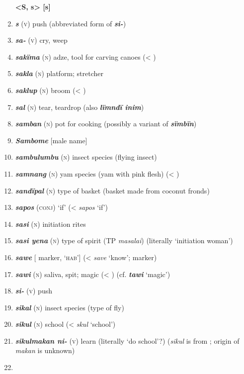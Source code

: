 \begin{enumerate}[noitemsep, label={}, align=left, widest=190, labelsep=1ex,leftmargin=*,itemindent=-10pt]
\noindent \textbf{<S, s>        [s]}\\ \item 

\textbf{\textit{s}} (\textsc{v}) push (abbreviated form of \textbf{\textit{si-}}) \item 
\textbf{\textit{sa-}} (\textsc{v}) cry, weep \item 
\textbf{\textit{sakïma}} (\textsc{n}) adze, tool for carving canoes (< ) \item 
\textbf{\textit{sakla}} (\textsc{n}) platform; stretcher \item 
\textbf{\textit{saklup}} (\textsc{n}) broom (< ) \item 
\textbf{\textit{sal}} (\textsc{n}) tear, teardrop (also \textbf{\textit{lïmndï inim}}) \item 
\textbf{\textit{samban}} (\textsc{n}) pot for cooking (possibly a variant of \textbf{\textit{sïmbïn}}) \item 
\textbf{\textit{Sambome}} [male name] \item 
\textbf{\textit{sambulumbu}} (\textsc{n}) insect species (flying insect) \item 
\textbf{\textit{samnang}} (\textsc{n}) yam species (yam with pink flesh) (< ) \item 
\textbf{\textit{sandïpal}} (\textsc{n}) type of basket (basket made from coconut fronds) \item 
\textbf{\textit{sapos}} (\textsc{conj}) ‘if’ (<  \textit{sapos} ‘if’) \item 
\textbf{\textit{sasi}} (\textsc{n}) initiation rites \item 
\textbf{\textit{sasi yena}} (\textsc{n}) type of spirit (TP \textit{masalai}) (literally ‘initiation woman’) \item 
\textbf{\textit{sawe}} [ marker, ‘\textsc{hab}’] (<  \textit{save} ‘know’;  marker) \item 
\textbf{\textit{sawi}} (\textsc{n}) saliva, spit; magic (< ) (cf. \textbf{\textit{tawi}} ‘magic’) \item 
\textbf{\textit{si-}} (\textsc{v}) push \item 
\textbf{\textit{sikal}} (\textsc{n}) insect species (type of fly) \item 
\textbf{\textit{sikul}} (\textsc{n}) school (<  \textit{skul} ‘school’) \item 
\textbf{\textit{sikulmakan ni-}} (\textsc{v}) learn (literally ‘do school’?) (\textit{sikul} is from ; origin of \textit{makan} is unknown) \item 

\end{enumerate}
